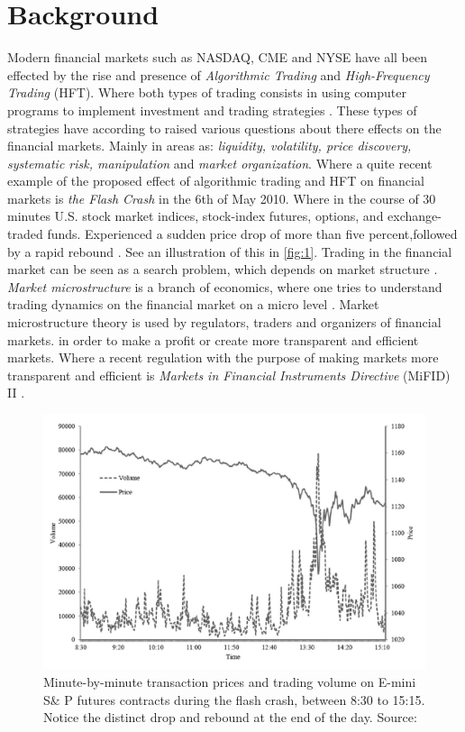 \documentclass{kththesis}
\theoremstyle{definition}
\begin{document}
\section{Background}
Modern financial markets such as NASDAQ, CME and NYSE have all been effected by the rise and presence of \textit{Algorithmic Trading} and \textit{High-Frequency Trading} (HFT).  Where both types of trading consists in using computer programs to implement investment and trading strategies \parencite{abergel2012market}. These types of strategies have according to \textcite{abergel2012market, o2015high} raised various questions about there effects on the financial markets. Mainly in areas as: \textit{liquidity, volatility, price discovery, systematic risk, manipulation} and \textit{market organization}. Where a quite recent example of the proposed effect of algorithmic trading and HFT on financial markets is \textit{the Flash Crash} in the 6th of May 2010. Where in the course of 30 minutes U.S. stock market indices, stock-index futures, options, and exchange-traded funds. Experienced a sudden price drop of more than five percent,followed by a rapid rebound \parencite{kirilenko2011flash,kirilenko2017flash}. See an illustration of this in \autoref{fig:1}.
\newline
\newline
Trading in the financial market can be seen as a search problem, which depends on market structure \parencite{abergel2012market}. \textit{Market microstructure} is a branch of economics, where one tries to understand trading dynamics on the financial market on a micro level \parencite{o1995market, hasbrouck2007empirical}. Market microstructure theory is used by regulators, traders and organizers of financial markets. in order to make a profit or create more transparent and efficient markets. Where a recent regulation with the purpose of making markets more transparent and efficient is \textit{Markets in Financial Instruments Directive} (MiFID) II \parencite{busch2016mifid}.

\begin{figure}[ht]
    \centering
    \includegraphics[scale=.7]{flashcrash.PNG}
    \caption{Minute-by-minute transaction prices and trading volume on E-mini S\& P futures contracts during the flash crash, between 8:30 to 15:15. Notice the distinct drop and rebound at the end of the day. Source: \textcite{kirilenko2017flash} }
    \label{fig:1}
\end{figure}
\end{document}
